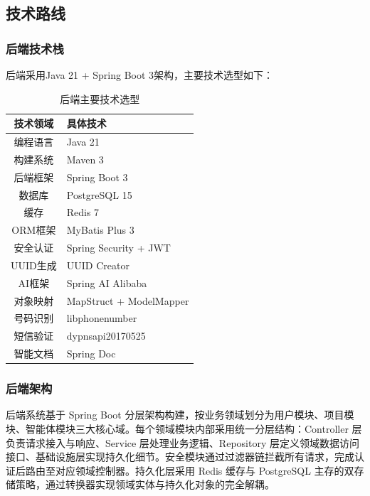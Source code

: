 \subsection{技术路线}

\subsubsection{后端技术栈}

\par 后端采用Java 21 + Spring Boot 3架构，主要技术选型如下：

\begin{table}[htbp]
    \caption{后端主要技术选型}
    \begin{tabularx}{\linewidth}{c|X<{\centering}}
        \hline
        \textbf{技术领域} & \textbf{具体技术} \\ \hline
        编程语言 & Java 21 \\ \hline
        构建系统 & Maven 3 \\ \hline
        后端框架 & Spring Boot 3 \\ \hline
        数据库 & PostgreSQL 15 \\ \hline
        缓存 & Redis 7 \\ \hline
        ORM框架 & MyBatis Plus 3 \\ \hline
        安全认证 & Spring Security + JWT \\ \hline
        UUID生成 & UUID Creator \\ \hline
        AI框架 & Spring AI Alibaba \\ \hline
        对象映射 & MapStruct + ModelMapper \\ \hline
        号码识别 & libphonenumber \\ \hline
        短信验证 & dypnsapi20170525 \\ \hline
        智能文档 & Spring Doc \\ \hline
    \end{tabularx}
\end{table}

\subsubsection{后端架构}

\par 后端系统基于 Spring Boot 分层架构构建，按业务领域划分为用户模块、项目模块、智能体模块三大核心域。每个领域模块内部采用统一分层结构：Controller 层负责请求接入与响应、Service 层处理业务逻辑、Repository 层定义领域数据访问接口、基础设施层实现持久化细节。安全模块通过过滤器链拦截所有请求，完成认证后路由至对应领域控制器。持久化层采用 Redis 缓存与 PostgreSQL 主存的双存储策略，通过转换器实现领域实体与持久化对象的完全解耦。

